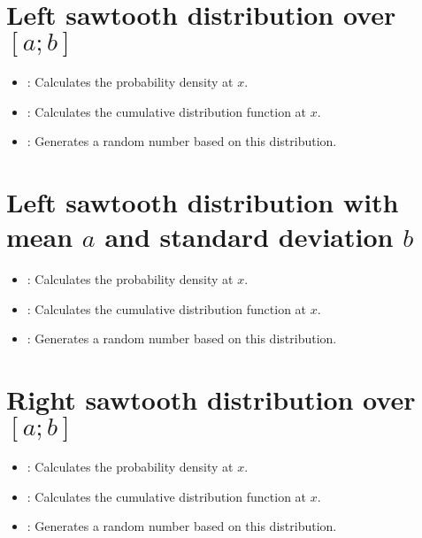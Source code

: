 \section{Left sawtooth distribution over \texorpdfstring{$[a;b]$}{[a;b]}}

\begin{itemize}

\item
{}:
Calculates the probability density at $x$.

\item
{}:
Calculates the cumulative distribution function at $x$.

\item
{}:
Generates a random number based on this distribution.

\end{itemize}



\section{Left sawtooth distribution with mean \texorpdfstring{$a$}{a} and standard deviation \texorpdfstring{$b$}{b}}

\begin{itemize}

\item
{}:
Calculates the probability density at $x$.

\item
{}:
Calculates the cumulative distribution function at $x$.

\item
{}:
Generates a random number based on this distribution.

\end{itemize}



\section{Right sawtooth distribution over \texorpdfstring{$[a;b]$}{[a;b]}}

\begin{itemize}

\item
{}:
Calculates the probability density at $x$.

\item
{}:
Calculates the cumulative distribution function at $x$.

\item
{}:
Generates a random number based on this distribution.

\end{itemize}




